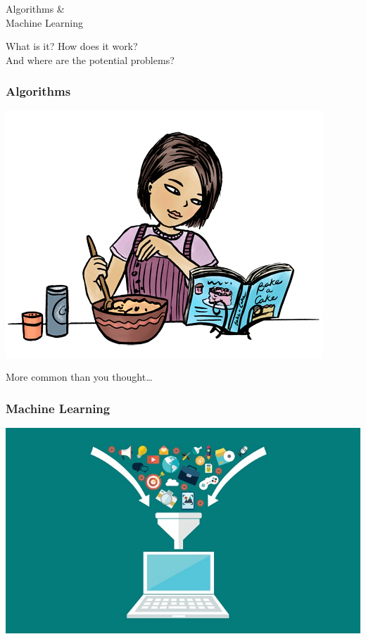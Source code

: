 \documentclass[aspectratio=169,x11names]{beamer}
\begin{document}
\begin{frame}
\begin{center}
\huge
Algorithms \&\\
Machine Learning
\bigskip

\large
What is it? How does it work?\\ And where are the potential problems?\end{center}
\end{frame}

\begin{frame}
\frametitle{Algorithms}
\begin{center}
\includegraphics[height=0.7\textheight, keepaspectratio]{images/recipe}

More common than you thought\dots
\end{center}
\end{frame}


\begin{frame}
\frametitle{Machine Learning}
\begin{center}
\includegraphics[height=0.8\textheight, keepaspectratio]{images/funnel}
\end{center}
\end{frame}
\end{document}

